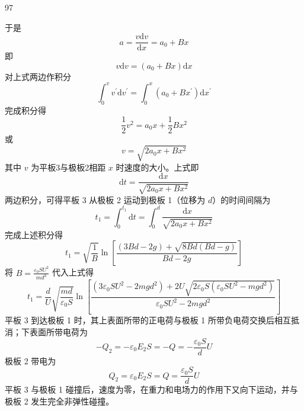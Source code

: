 \begin{solution}{97}
\begin{subsolution}
        于是
        \begin{equation*}
            a = \frac {v \mathrm{d} v}{\mathrm{d} x} = a _ {0} + B x
        \end{equation*}
        即
        \begin{equation*}
            v \mathrm{d} v = (a _ {0} + B x) \mathrm{d} x
        \end{equation*}
        对上式两边作积分
        \begin{equation*}
            \int_ {0} ^ {v} v ^ {\prime} \mathrm{d} v ^ {\prime} = \int_ {0} ^ {x} (a _ {0} + B x ^ {\prime}) \mathrm{d} x ^ {\prime}
        \end{equation*}
        完成积分得
        \begin{equation*}
            \frac {1}{2} v ^ {2} = a _ {0} x + \frac {1}{2} B x ^ {2}
        \end{equation*}
        或
        \begin{equation*}
            v = \sqrt {2 a _ {0} x + B x ^ {2}}
        \end{equation*}
        其中 $v$ 为平板3与极板2相距 $x$ 时速度的大小。上式即
        \begin{equation}
            \mathrm{d} t = \frac {\mathrm{d} x}{\sqrt {2 a _ {0} x + B x ^ {2}}}
            \label{eq:9.p97}
        \end{equation}
        两边积分，可得平板 3 从极板 2 运动到极板 1（位移为 $d$）的时间间隔为
        \begin{equation*}
            t _ {1} = \int_ {0} ^ {t _ {1}} \mathrm{d} t = \int_ {0} ^ {d} \frac {\mathrm{d} x}{\sqrt {2 a _ {0} x + B x ^ {2}}}
        \end{equation*}
        完成上述积分得
        \begin{equation*}
            t _ {1} = \sqrt {\frac {1}{B}} \ln \left[ \frac {(3 B d - 2 g) + \sqrt {8 B d (B d - g)}}{B d - 2 g} \right]
        \end{equation*}
        将 $B = \frac{\varepsilon_0SU^2}{md^3}$ 代入上式得
        \begin{equation}
            t _ {1} = \frac {d}{U} \sqrt {\frac {m d}{\varepsilon_ {0} S}} \ln \left[ \frac {\left(3 \varepsilon_ {0} S U ^ {2} - 2 m g d ^ {2}\right) + 2 U \sqrt {2 \varepsilon_ {0} S \left(\varepsilon_ {0} S U ^ {2} - m g d ^ {2}\right)}}{\varepsilon_ {0} S U ^ {2} - 2 m g d ^ {2}} \right]
            \label{eq:10.p97}
        \end{equation}
        平板 3 到达极板 1 时，其上表面所带的正电荷与极板 1 所带负电荷交换后相互抵消；下表面所带电荷为
        \begin{equation*}
            - Q _ {2} = - \varepsilon_ {0} E _ {2} S = - Q = - \frac {\varepsilon_ {0} S}{d} U
        \end{equation*}
        极板 2 带电为
        \begin{equation*}
            Q _ {2} = \varepsilon_ {0} E _ {2} S = Q = \frac {\varepsilon_ {0} S}{d} U
        \end{equation*}
        平板 3 与极板 1 碰撞后，速度为零，在重力和电场力的作用下又向下运动，并与极板 2 发生完全非弹性碰撞。


\end{subsolution}
\end{solution}
